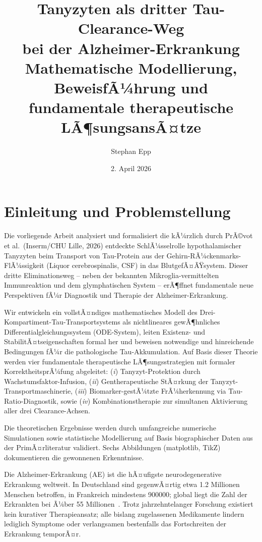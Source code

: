﻿\documentclass[12pt,a4paper]{article}
\title{{\bfseries Tanyzyten als dritter Tau-Clearance-Weg \\ bei der Alzheimer-Erkrankung}\\
		Mathematische Modellierung, BeweisfÃ¼hrung
		und fundamentale therapeutische LÃ¶sungsansÃ¤tze
}
\author{Stephan Epp}
\date{2. April 2026}
\theoremstyle{definition}
\begin{document}
	
	\maketitle
	\tableofcontents
	\newpage
	
	\section{Einleitung und Problemstellung}
	
	Die vorliegende Arbeit analysiert und formalisiert die kÃ¼rzlich durch PrÃ©vot et al.\ (Inserm/CHU Lille, 2026) entdeckte SchlÃ¼sselrolle hypothalamischer Tanyzyten beim Transport von Tau-Protein aus der Gehirn-RÃ¼ckenmarks-FlÃ¼ssigkeit (Liquor cerebrospinalis, CSF) in das BlutgefÃ¤ÃŸsystem. Dieser dritte Eliminationsweg -- neben der bekannten Mikroglia-vermittelten Immunreaktion und dem glymphatischen System -- erÃ¶ffnet fundamentale neue Perspektiven fÃ¼r Diagnostik und Therapie der Alzheimer-Erkrankung.
	
	Wir entwickeln ein vollstÃ¤ndiges mathematisches Modell des Drei-Kompartiment-Tau-Transportsystems als nichtlineares gewÃ¶hnliches Differentialgleichungssystem (ODE-System), leiten Existenz- und StabilitÃ¤tseigenschaften formal her und beweisen notwendige und hinreichende Bedingungen fÃ¼r die pathologische Tau-Akkumulation. Auf Basis dieser Theorie werden vier fundamentale therapeutische LÃ¶sungsstrategien mit formaler KorrektheitsprÃ¼fung abgeleitet: (\emph{i}) Tanyzyt-Protektion durch Wachstumsfaktor-Infusion, (\emph{ii}) Gentherapeutische StÃ¤rkung der Tanyzyt-Transportmaschinerie, (\emph{iii}) Biomarker-gestÃ¼tzte FrÃ¼herkennung via Tau-Ratio-Diagnostik, sowie (\emph{iv}) Kombinationstherapie zur simultanen Aktivierung aller drei Clearance-Achsen.
	
	Die theoretischen Ergebnisse werden durch umfangreiche numerische Simulationen sowie statistische Modellierung auf Basis biographischer Daten aus der PrimÃ¤rliteratur validiert. Sechs Abbildungen (matplotlib, TikZ) dokumentieren die gewonnenen Erkenntnisse.
	
	Die Alzheimer-Erkrankung (AE) ist die hÃ¤ufigste neurodegenerative Erkrankung weltweit. In Deutschland sind gegenwÃ¤rtig etwa \num{1.2} Millionen Menschen betroffen, in Frankreich mindestens \num{900000}; global liegt die Zahl der Erkrankten bei Ã¼ber 55 Millionen~\cite{WHO2023}. Trotz jahrzehntelanger Forschung existiert kein kurativer Therapieansatz; alle bislang zugelassenen Medikamente lindern lediglich Symptome oder verlangsamen bestenfalls das Fortschreiten der Erkrankung temporÃ¤r.
	
\end{document}
